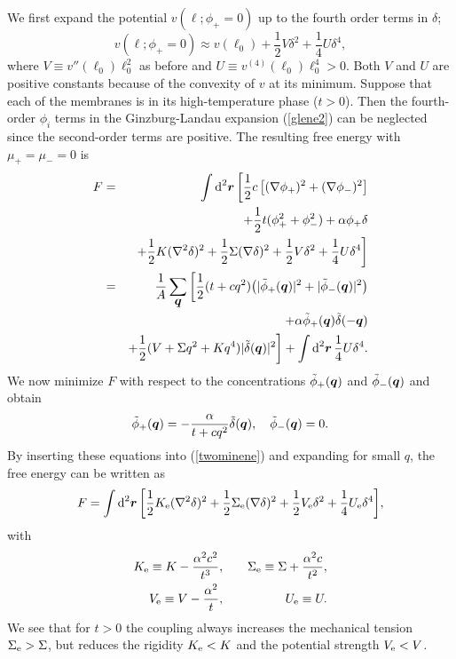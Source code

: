 We first expand the potential $v(\ell; \phi_+=0)$ up to the fourth order terms
in $\delta$;
%
\begin{equation}
v(\ell; \phi_+=0) \approx v(\ell_0) + \frac{1}{2}V \delta^2 +
\frac{1}{4}U \delta ^4,
\end{equation}
%
where $V \equiv v''(\ell_0)\ell_0^2$  as before and
$U \equiv v^{(4)}(\ell_0)\ell_0^4 > 0$.
Both $V$ and $U$ are positive constants
because of the convexity of $v$ at its minimum.
Suppose that each of the membranes is in its high-temperature phase ($t>0$).
Then the fourth-order $\phi_i$ terms in the Ginzburg-Landau expansion
(\ref{glene2}) can be neglected since the second-order terms are
positive.
The resulting free energy with $\mu_+ = \mu_- = 0$ is
%
\begin{eqnarray}
F & = & \int \mbox{d}^2 \mbox{\boldmath $r$} \, \biggl[
\frac{1}{2} c \left[ (\nabla \phi_+)^2 + (\nabla \phi_-)^2 \right]
\nonumber  \\ & & +\frac{1}{2} t (\phi_+^2 + \phi_-^2) + \alpha
\phi_+ \delta \nonumber  \\ & & + \frac{1}{2} K (\nabla^2
\delta)^2  + \frac{1}{2} \Sigma (\nabla \delta)^2  + \frac{1}{2}V
\delta^2 + \frac{1}{4}U \delta^4 \biggr]  \nonumber  \\ & = &
\frac{1}{A}\sum_{\mbox{\boldmath $q$}} \, \biggl[ \frac{1}{2} (t
+c q^2) \big( \vert \tilde{\phi}_+(\mbox{\boldmath $q$}) \vert^2
+ \vert \tilde{\phi}_-(\mbox{\boldmath $q$}) \vert^2 \big)
\nonumber
\\ & & + \alpha \tilde{\phi}_+(\mbox{\boldmath $q$})
\tilde{\delta}(-\mbox{\boldmath $q$}) \nonumber  \\ & & +
\frac{1}{2} (V + \Sigma q^2 + K q^4) \vert
\tilde{\delta}(\mbox{\boldmath $q$}) \vert^2
 \biggr]
+ \int \mbox{d}^2 \mbox{\boldmath $r$} \, \frac{1}{4} U \delta^4.
\label{twominene}
\end{eqnarray}
%
We now minimize $F$ with respect to the concentrations
$\tilde{\phi}_+(\mbox{\boldmath $q$})$ and
$\tilde{\phi}_-(\mbox{\boldmath $q$})$ and obtain
\begin{equation}
\tilde{\phi}_+(\mbox{\boldmath $q$}) = - \frac{\alpha}{t+c q^2}
\tilde{\delta}(\mbox{\boldmath $q$}),~~~
\tilde{\phi}_-(\mbox{\boldmath $q$}) = 0.
\end{equation}
By inserting these equations into (\ref{twominene}) and expanding for
small $q$, the free energy can be written as
\begin{equation}
F = \int \mbox{d}^2 \mbox{\boldmath $r$} \, \biggl[ \frac{1}{2}
K_{\rm e} (\nabla^2 \delta)^2 +\frac{1}{2} \Sigma_{\rm e} (\nabla
\delta)^2 +\frac{1}{2} {V}_{\rm e} \delta^2 +\frac{1}{4} {U}_{\rm
e} \delta^4 \biggl], \label{memene}
\end{equation}
with
\begin{eqnarray}
{K}_{\rm e} \equiv K - \frac{\alpha^2 c^2}{t^3},~~~& &
{\Sigma}_{\rm e} \equiv \Sigma + \frac{\alpha^2 c}{t^2},
\nonumber  \\
{V}_{\rm e} \equiv V - \frac{\alpha^2}{t},~~~& &
{U}_{\rm e} \equiv U.
\end{eqnarray}
We see that for $t>0$ the coupling always
increases the mechanical tension $\Sigma_{\rm e} > \Sigma$, but reduces
the rigidity $K_{\rm e} < K$ and the potential strength $V_{\rm e} < V$.


